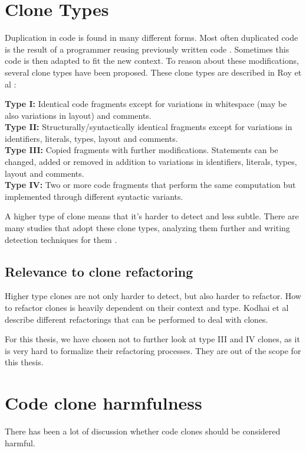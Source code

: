 \documentclass{report}
\theoremstyle{definition}
\theoremstyle{remark}
\begin{document}
\section{Clone Types}
Duplication in code is found in many different forms. Most often duplicated code is the result of a programmer reusing previously written code \cite{haefliger2008code, baxter1998clone}. Sometimes this code is then adapted to fit the new context. To reason about these modifications, several clone types have been proposed. These clone types are described in Roy et al \cite{roy2007survey}:
\begin{displayquote}
\textbf{Type I:} Identical code fragments except for variations in whitespace (may be also variations in layout) and comments.\\
\textbf{Type II:} Structurally/syntactically identical fragments except for variations in identifiers, literals, types, layout and comments.\\
\textbf{Type III:} Copied fragments with further modifications. Statements can be changed, added or removed in addition to variations in identifiers, literals, types, layout and comments.\\
\textbf{Type IV:} Two or more code fragments that perform the same computation but implemented through different syntactic variants.
\end{displayquote}
A higher type of clone means that it's harder to detect and less subtle. There are many studies that adopt these clone types, analyzing them further and writing detection techniques for them \cite{sajnani2016sourcerercc, kodhai2010detection, van2019novel}.

\subsection{Relevance to clone refactoring}
Higher type clones are not only harder to detect, but also harder to refactor. How to refactor clones is heavily dependent on their context and type. Kodhai et al \cite{kodhai2013method} describe different refactorings that can be performed to deal with clones.

For this thesis, we have chosen not to further look at type III and IV clones, as it is very hard to formalize their refactoring processes. They are out of the scope for this thesis.

\section{Code clone harmfulness}
There has been a lot of discussion whether code clones should be considered harmful.
\end{document}
